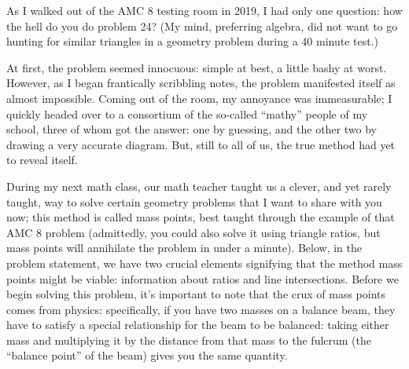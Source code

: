 \documentclass{article}
\begin{document}
\begin{multicols}{3}


As I walked out of the AMC 8 testing room in 2019, I had only one question: how the hell do you do problem 24? (My mind, preferring algebra, did not want to go hunting for similar triangles in a geometry problem during a 40 minute test.) 

\vspace{5mm}
\noindent{}
\vspace{5mm}

At first, the problem seemed innocuous: simple at best, a little bashy at worst. However, as I began frantically scribbling notes, the problem manifested itself as almost impossible. Coming out of the room, my annoyance was immeasurable; I quickly headed over to a consortium of the so-called “mathy” people of my school, three of whom got the answer: one by guessing, and the other two by drawing a very accurate diagram. But, still to all of us, the true method had yet to reveal itself.



During my next math class, our math teacher taught us a clever, and yet rarely taught, way to solve certain geometry problems that I want to share with you now; this method is called mass points, best taught through the example of that AMC 8 problem (admittedly, you could also solve it using triangle ratios, but mass points will annihilate the problem in under a minute). 
Below, in the problem statement, we have two crucial elements signifying that the method mass points might be viable: information about ratios and line intersections. Before we begin solving this problem, it’s important to note that the crux of mass points comes from physics: specifically, if you have two masses on a balance beam, they have to satisfy a special relationship for the beam to be balanced: taking either mass and multiplying it by the distance from that mass to the fulcrum (the “balance point” of the beam) gives you the same quantity. 


\end{multicols}
\end{document}
